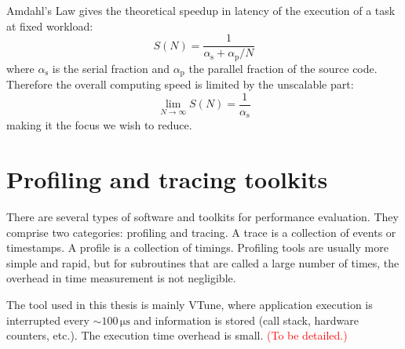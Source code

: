 Amdahl's Law gives the theoretical speedup in latency of the execution
of a task at fixed workload:
\begin{equation}
S(N)=\dfrac{1}{\alpha_{\mathrm{s}}+\alpha_{\mathrm{p}}/N}
\end{equation}
where $\alpha_{\mathrm{s}}$ is the serial fraction and $\alpha_{\mathrm{p}}$
the parallel fraction of the source code. Therefore the overall computing
speed is limited by the unscalable part:
\begin{equation}
\lim_{N\rightarrow\infty}S(N)=\frac{1}{\alpha_{\mathrm{s}}}
\end{equation}
making it the focus we wish to reduce.


\section{Profiling and tracing toolkits}

There are several types of software and toolkits for performance evaluation.
They comprise two categories: profiling and tracing. A trace is a
collection of events or timestamps. A profile is a collection of timings.
Profiling tools are usually more simple and rapid, but for subroutines
that are called a large number of times, the overhead in time measurement
is not negligible. 

The tool used in this thesis is mainly VTune, where application execution
is interrupted every $\sim100\,\mathrm{\mu s}$ and information is
stored (call stack, hardware counters, etc.). The execution time overhead
is small. \textcolor{red}{(To be detailed.)}
